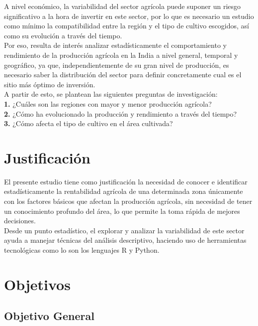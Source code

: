 \documentclass[oneside,11pt]{Latex/Classes/PhDthesisPSnPDF}
\begin{document}
A nivel económico, la variabilidad del sector agrícola puede suponer un
riesgo significativo a la hora de invertir en este sector, por lo que es
necesario un estudio como mínimo la compatibilidad entre la región y el
tipo de cultivo escogidos, así como su evolución a través del tiempo.\\

Por eso, resulta de interés analizar estadísticamente el comportamiento
y rendimiento de la producción agrícola en la India a nivel general,
temporal y geográfico, ya que, independientemente de su gran nivel de
producción, es necesario saber la distribución del sector para definir
concretamente cual es el sitio más óptimo de inversión.\\

A partir de esto, se plantean las siguientes preguntas de
investigación:\\

\textbf{1.} ¿Cuáles son las regiones con mayor y menor producción
agrícola?\\

\textbf{2.} ¿Cómo ha evolucionado la producción y rendimiento a través
del tiempo?\\

\textbf{3.} ¿Cómo afecta el tipo de cultivo en el área cultivada?\\

\section{Justificación}

El presente estudio tiene como justificación la necesidad de conocer e
identificar estadísticamente la rentabilidad agrícola de una determinada
zona únicamente con los factores básicos que afectan la producción
agrícola, sin necesidad de tener un conocimiento profundo del área, lo
que permite la toma rápida de mejores decisiones.\\

Desde un punto estadístico, el explorar y analizar la variabilidad de
este sector ayuda a manejar técnicas del análisis descriptivo, haciendo
uso de herramientas tecnológicas como lo son los lenguajes R y Python.

\section{Objetivos}

\subsection{Objetivo General}
\end{document}
